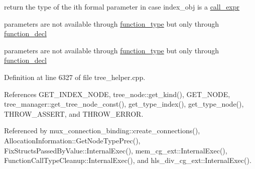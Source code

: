 return the type of the ith formal parameter in case index\+\_\+obj is a \hyperlink{structcall__expr}{call\+\_\+expr} 

parameters are not available through \hyperlink{structfunction__type}{function\+\_\+type} but only through \hyperlink{structfunction__decl}{function\+\_\+decl}

parameters are not available through \hyperlink{structfunction__type}{function\+\_\+type} but only through \hyperlink{structfunction__decl}{function\+\_\+decl} 

Definition at line 6327 of file tree\+\_\+helper.\+cpp.



References G\+E\+T\+\_\+\+I\+N\+D\+E\+X\+\_\+\+N\+O\+DE, tree\+\_\+node\+::get\+\_\+kind(), G\+E\+T\+\_\+\+N\+O\+DE, tree\+\_\+manager\+::get\+\_\+tree\+\_\+node\+\_\+const(), get\+\_\+type\+\_\+index(), get\+\_\+type\+\_\+node(), T\+H\+R\+O\+W\+\_\+\+A\+S\+S\+E\+RT, and T\+H\+R\+O\+W\+\_\+\+E\+R\+R\+OR.



Referenced by mux\+\_\+connection\+\_\+binding\+::create\+\_\+connections(), Allocation\+Information\+::\+Get\+Node\+Type\+Prec(), Fix\+Structs\+Passed\+By\+Value\+::\+Internal\+Exec(), mem\+\_\+cg\+\_\+ext\+::\+Internal\+Exec(), Function\+Call\+Type\+Cleanup\+::\+Internal\+Exec(), and hls\+\_\+div\+\_\+cg\+\_\+ext\+::\+Internal\+Exec().

